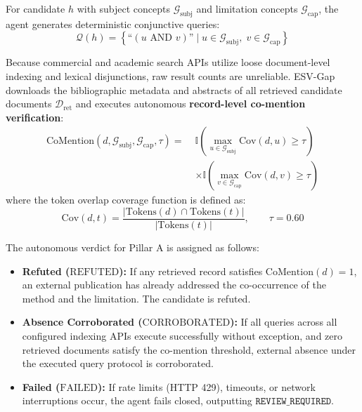 \documentclass[conference,10pt]{IEEEtran}
\newcommand{\method}{ESV-Gap}
\begin{document}
For candidate $h$ with subject concepts $\mathcal{G}_{\text{subj}}$ and limitation concepts $\mathcal{G}_{\text{cap}}$, the agent generates deterministic conjunctive queries:
\begin{equation}
\mathcal{Q}(h) = \left\{ \text{``}(u \text{ AND } v)\text{''} \mid u \in \mathcal{G}_{\text{subj}}, \; v \in \mathcal{G}_{\text{cap}} \right\}
\end{equation}

Because commercial and academic search APIs utilize loose document-level indexing and lexical disjunctions, raw result counts are unreliable. \method{} downloads the bibliographic metadata and abstracts of all retrieved candidate documents $\mathcal{D}_{\text{ret}}$ and executes autonomous \textbf{record-level co-mention verification}:
\begin{equation}
\begin{aligned}
\mathrm{CoMention}(d, \mathcal{G}_{\text{subj}}, \mathcal{G}_{\text{cap}}, \tau) = \; &\mathbb{I}\left( \max_{u \in \mathcal{G}_{\text{subj}}} \mathrm{Cov}(d, u) \ge \tau \right) \\
&\times \mathbb{I}\left( \max_{v \in \mathcal{G}_{\text{cap}}} \mathrm{Cov}(d, v) \ge \tau \right)
\end{aligned}
\end{equation}
where the token overlap coverage function is defined as:
\begin{equation}
\mathrm{Cov}(d, t) = \frac{|\mathrm{Tokens}(d) \cap \mathrm{Tokens}(t)|}{|\mathrm{Tokens}(t)|}, \qquad \tau = 0.60
\end{equation}

The autonomous verdict for Pillar A is assigned as follows:
\begin{itemize}[leftmargin=1.5em]
  \item \textbf{Refuted ($\mathrm{REFUTED}$):} If any retrieved record satisfies $\mathrm{CoMention}(d) = 1$, an external publication has already addressed the co-occurrence of the method and the limitation. The candidate is refuted.
  \item \textbf{Absence Corroborated ($\mathrm{CORROBORATED}$):} If all queries across all configured indexing APIs execute successfully without exception, and zero retrieved documents satisfy the co-mention threshold, external absence under the executed query protocol is corroborated.
  \item \textbf{Failed ($\mathrm{FAILED}$):} If rate limits (HTTP 429), timeouts, or network interruptions occur, the agent fails closed, outputting $\texttt{REVIEW\_REQUIRED}$.
\end{itemize}
\end{document}
